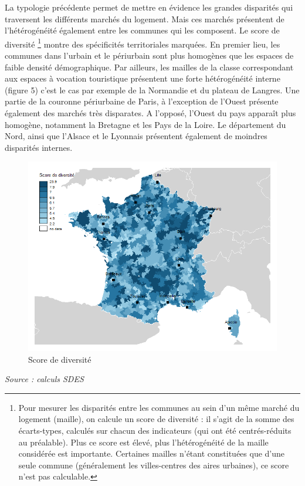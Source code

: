 \documentclass[12pt, a4paper]{article}
\begin{document}
La typologie précédente permet de mettre en évidence les grandes disparités qui traversent les différents marchés du logement. Mais ces marchés présentent de l'hétérogénéité également entre les communes qui les composent. Le score de diversité \footnote{Pour mesurer les disparités entre les communes au sein d'un même marché du logement (maille), on calcule un score de diversité : il s'agit de la somme des écarts-types, calculés sur chacun des indicateurs (qui ont été centrés-réduits au préalable). Plus ce score est élevé, plus l'hétérogénéité de la maille considérée est importante. Certaines mailles n'étant constituées que d’une seule commune (généralement les villes-centres des aires urbaines), ce score n'est pas calculable.} montre des spécificités territoriales marquées. En premier lieu, les communes dans l'urbain et le périurbain sont plus homogènes que les espaces de faible densité démographique. Par ailleurs, les mailles de la classe correspondant aux espaces à vocation touristique présentent une forte hétérogénéité interne (figure 5) c'est le cas par exemple de la Normandie et du plateau de Langres. Une partie de la couronne périurbaine de Paris, à l'exception de l'Ouest présente également des marchés très disparates. A l'opposé, l'Ouest du pays apparaît plus homogène, notamment la Bretagne et les Pays de la Loire. Le département du Nord, ainsi que l'Alsace et le Lyonnais présentent également de moindres disparités internes.

\begin{figure}[H]
\caption{Score de diversité}
\begin{center}
\includegraphics[scale=.8]{img/Diversite.png}
\end{center}
\end{figure}
\emph{Source : calculs SDES}
\end{document}
